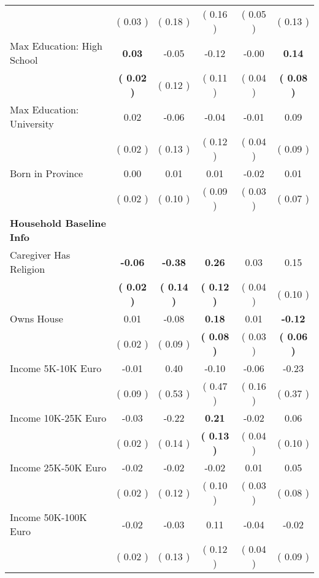 \begin{table}[H]
{\begin{tabular}{lccccc}
\quad  & (     0.03 ) & (     0.18 )  & (     0.16 )  & (     0.05 ) & (     0.13 ) \\
\quad Max Education: High School & \textbf{     0.03} &     -0.05 &     -0.12 &     -0.00 & \textbf{     0.14} \\
\quad  & \textbf{(     0.02 )} & (     0.12 )  & (     0.11 )  & (     0.04 ) & \textbf{(     0.08 )} \\
\quad Max Education: University &      0.02 &     -0.06 &     -0.04 &     -0.01 &      0.09 \\
\quad  & (     0.02 ) & (     0.13 )  & (     0.12 )  & (     0.04 ) & (     0.09 ) \\
\quad Born in Province &      0.00 &      0.01 &      0.01 &     -0.02 &      0.01 \\
\quad  & (     0.02 ) & (     0.10 )  & (     0.09 )  & (     0.03 ) & (     0.07 ) \\
\midrule
\textbf{Household Baseline Info} \\
\quad Caregiver Has Religion & \textbf{    -0.06} & \textbf{    -0.38} & \textbf{     0.26} &      0.03 &      0.15 \\
\quad  & \textbf{(     0.02 )} & \textbf{(     0.14 )}  & \textbf{(     0.12 )}  & (     0.04 ) & (     0.10 ) \\
\quad Owns House &      0.01 &     -0.08 & \textbf{     0.18} &      0.01 & \textbf{    -0.12} \\
\quad  & (     0.02 ) & (     0.09 )  & \textbf{(     0.08 )}  & (     0.03 ) & \textbf{(     0.06 )} \\
\quad Income 5K-10K Euro &     -0.01 &      0.40 &     -0.10 &     -0.06 &     -0.23 \\
\quad  & (     0.09 ) & (     0.53 )  & (     0.47 )  & (     0.16 ) & (     0.37 ) \\
\quad Income 10K-25K Euro &     -0.03 &     -0.22 & \textbf{     0.21} &     -0.02 &      0.06 \\
\quad  & (     0.02 ) & (     0.14 )  & \textbf{(     0.13 )}  & (     0.04 ) & (     0.10 ) \\
\quad Income 25K-50K Euro &     -0.02 &     -0.02 &     -0.02 &      0.01 &      0.05 \\
\quad  & (     0.02 ) & (     0.12 )  & (     0.10 )  & (     0.03 ) & (     0.08 ) \\
\quad Income 50K-100K Euro &     -0.02 &     -0.03 &      0.11 &     -0.04 &     -0.02 \\
\quad  & (     0.02 ) & (     0.13 )  & (     0.12 )  & (     0.04 ) & (     0.09 ) \\

\end{tabular}}
\end{table}
